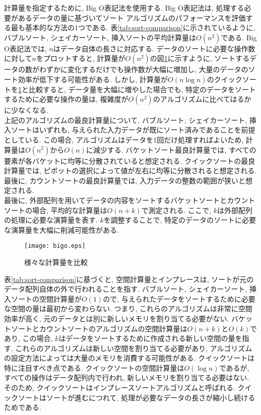 \documentclass[a4j, 11pt]{jarticle}
\begin{document}
計算量を指定するために, Big O表記法を使用する. Big O表記法は, 処理する必要があるデータの量に基づいてソート アルゴリズムのパフォーマンスを評価する最も基本的な方法の1つである. 表\ref{tab:sort-comparison}に示されているように, バブルソート, シェイカーソート, 挿入ソートの平均計算量は$O(n^2)$である. Big O表記法では, $n$はデータ自体の長さに対応する. データのソートに必要な操作数に対して$n$をプロットすると, 計算量が$O(n^2)$の図\ref{bigograph}に示すように, ソートするデータの数がわずかに変化するだけでも操作数が大幅に増加し, 大量のデータのソート効率が低下する可能性がある. しかし, 計算量が$O(n \log n)$のクイックソートを\ref{bigograph}と比較すると, データ量を大幅に増やした場合でも, 特定のデータをソートするために必要な操作の量は, 複雑度が$O(n^2)$のアルゴリズムに比べてはるかに少なくなる.\\

上記のアルゴリズムの最良計算量について, バブルソート, シェイカーソート, 挿入ソートはいずれも, 与えられた入力データが既にソート済みであることを前提としている. この場合, アルゴリズムはデータを1回だけ処理すればよいため, 計算量は$O(n^2)$から$O(n)$に減少する. バケットソート最良計算量では, すべての要素が各バケットに均等に分散されていると想定される. クイックソートの最良計算量では, ピボットの選択によって値が左右に均等に分散されると想定される. 最後に, カウントソートの最良計算量では, 入力データの整数の範囲が狭いと想定される. \\

最後に, 外部配列を用いてデータの内容をソートするバケットソートとカウントソートの場合, 平均的な計算量は$O(n + k)$で測定される. ここで, $k$は外部配列の処理に必要な演算量を表す. $k$を調整することで, 特定のデータのソートに必要な演算量を大幅に削減可能性がある.\\

\begin{figure}[H]
  \centering
  \texttt{[image: bigo.eps]}
  \caption{様々な計算量を比較}\label{bigograph}
\end{figure}

表\ref{tab:sort-comparison}に基づくと, 空間計算量とインプレースは, ソートが元のデータ配列自体の外で行われることを指す. バブルソート, シェイカーソート, 挿入ソートの空間計算量が$O(1)$ので, 与えられたデータをソートするために必要な空間の量は最初から変わらない. つまり, これらのアルゴリズムは非常に空間効率が高く, 元のデータとは別に新しいメモリを割り当てる必要がない. バケットソートとカウントソートのアルゴリズムの空間計算量は$O(n + k)$と$O(k)$であり, この場合, $k$はデータをソートするために作成される新しい空間の量を指す. これらのアルゴリズムは新しい空間を割り当てる必要があり, アルゴリズムの設定方法によっては大量のメモリを消費する可能性がある. クイックソートは特に注目すべき点である. クイックソートの空間計算量は$O(\log n)$であるが, すべての操作はデータ配列内で行われ, 新しいメモリを割り当てる必要はない. そのため, クイックソートはインプレースソートアルゴリズムと呼ばれる. クイックソートはソートが進むにつれて, 処理が必要なデータの長さが縮小し続けるためである.\\
\end{document}
